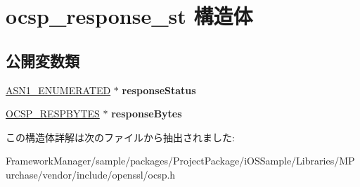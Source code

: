 \hypertarget{structocsp__response__st}{}\section{ocsp\+\_\+response\+\_\+st 構造体}
\label{structocsp__response__st}
\subsection*{公開変数類}
\begin{DoxyCompactItemize}
\item 
\hypertarget{structocsp__response__st_a5c79d6dd4c93fb0946fc1e94467589fe}{}\hyperlink{structasn1__string__st}{A\+S\+N1\+\_\+\+E\+N\+U\+M\+E\+R\+A\+T\+E\+D} $\ast$ {\bfseries response\+Status}\label{structocsp__response__st_a5c79d6dd4c93fb0946fc1e94467589fe}

\item 
\hypertarget{structocsp__response__st_a4724a80cc511a45789534e55588e5b9c}{}\hyperlink{structocsp__resp__bytes__st}{O\+C\+S\+P\+\_\+\+R\+E\+S\+P\+B\+Y\+T\+E\+S} $\ast$ {\bfseries response\+Bytes}\label{structocsp__response__st_a4724a80cc511a45789534e55588e5b9c}

\end{DoxyCompactItemize}


この構造体詳解は次のファイルから抽出されました\+:\begin{DoxyCompactItemize}
\item 
Framework\+Manager/sample/packages/\+Project\+Package/i\+O\+S\+Sample/\+Libraries/\+M\+Purchase/vendor/include/openssl/ocsp.\+h\end{DoxyCompactItemize}
